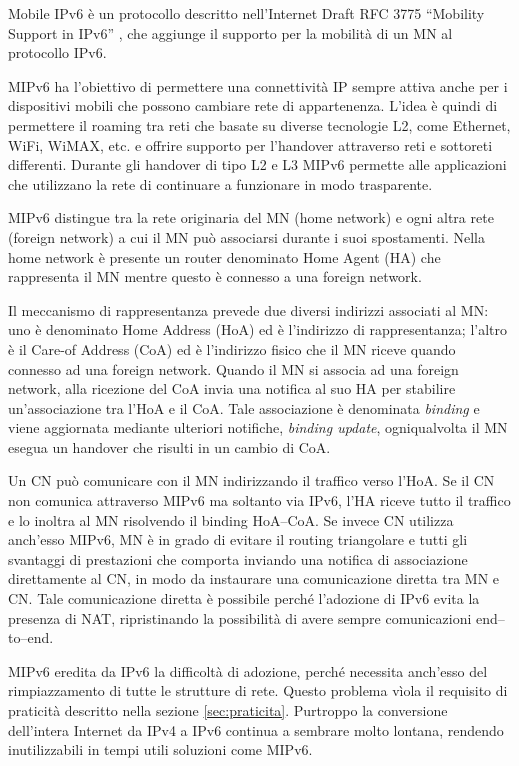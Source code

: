 \documentclass[12pt,a4paper,openright,twoside]{book}
\begin{document}
Mobile IPv6 è un protocollo descritto nell'Internet Draft RFC 3775
``Mobility Support in IPv6'' \cite{bib:mipv6}, che aggiunge il
supporto per la mobilità di un MN al protocollo IPv6.

MIPv6 ha l'obiettivo di permettere una connettività IP sempre attiva
anche per i dispositivi mobili che possono cambiare rete di
appartenenza. L'idea è quindi di permettere il roaming tra reti
che basate su diverse tecnologie L2, come Ethernet, WiFi, WiMAX,
etc. e offrire supporto per l'handover attraverso reti e sottoreti
differenti. Durante gli handover di tipo L2 e L3 MIPv6 permette alle
applicazioni che utilizzano la rete di continuare a funzionare in modo
trasparente.

MIPv6 distingue tra la rete originaria del MN (home network) e ogni
altra rete (foreign network) a cui il MN può associarsi durante i suoi
spostamenti. Nella home network è presente un router denominato Home
Agent (HA) che rappresenta il MN mentre questo è connesso a una
foreign network.

Il meccanismo di rappresentanza prevede due diversi indirizzi
associati al MN: uno è denominato Home Address (HoA) ed è l'indirizzo
di rappresentanza; l'altro è il Care-of Address (CoA) ed è l'indirizzo
fisico che il MN riceve quando connesso ad una foreign network. Quando
il MN si associa ad una foreign network, alla ricezione del CoA invia
una notifica al suo HA per stabilire un'associazione tra l'HoA e il
CoA. Tale associazione è denominata \emph{binding} e viene aggiornata
mediante ulteriori notifiche, \emph{binding update}, ogniqualvolta il
MN esegua un handover che risulti in un cambio di CoA.

Un CN può comunicare con il MN indirizzando il traffico verso
l'HoA. Se il CN non comunica attraverso MIPv6 ma soltanto via IPv6,
l'HA riceve tutto il traffico e lo inoltra al MN risolvendo il binding
HoA--CoA. Se invece CN utilizza anch'esso MIPv6, MN è in grado di
evitare il routing triangolare e tutti gli svantaggi di prestazioni
che comporta inviando una notifica di associazione direttamente al CN,
in modo da instaurare una comunicazione diretta tra MN e CN. Tale
comunicazione diretta è possibile perché l'adozione di IPv6 evita la
presenza di NAT, ripristinando la possibilità di avere sempre
comunicazioni end--to--end.

MIPv6 eredita da IPv6 la difficoltà di adozione, perché necessita
anch'esso del rimpiazzamento di tutte le strutture di rete. Questo
problema vìola il requisito di praticità descritto nella sezione
\ref{sec:praticita}. Purtroppo la conversione dell'intera Internet
da IPv4 a IPv6 continua a sembrare molto lontana, rendendo
inutilizzabili in tempi utili soluzioni come MIPv6.
\end{document}
